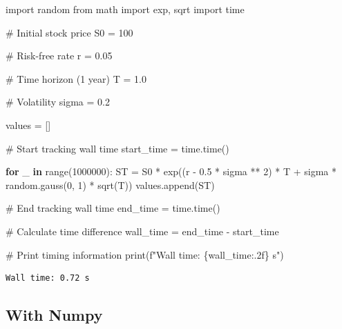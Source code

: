 \documentclass[
  letterpaper,
  DIV=11,
  numbers=noendperiod]{scrreprt}
\newenvironment{Shaded}{\begin{snugshade}}{\end{snugshade}}
\newcommand{\BuiltInTok}[1]{\textcolor[rgb]{0.00,0.23,0.31}{#1}}
\newcommand{\CommentTok}[1]{\textcolor[rgb]{0.37,0.37,0.37}{#1}}
\newcommand{\ControlFlowTok}[1]{\textcolor[rgb]{0.00,0.23,0.31}{\textbf{#1}}}
\newcommand{\DecValTok}[1]{\textcolor[rgb]{0.68,0.00,0.00}{#1}}
\newcommand{\FloatTok}[1]{\textcolor[rgb]{0.68,0.00,0.00}{#1}}
\newcommand{\ImportTok}[1]{\textcolor[rgb]{0.00,0.46,0.62}{#1}}
\newcommand{\KeywordTok}[1]{\textcolor[rgb]{0.00,0.23,0.31}{\textbf{#1}}}
\newcommand{\NormalTok}[1]{\textcolor[rgb]{0.00,0.23,0.31}{#1}}
\newcommand{\OperatorTok}[1]{\textcolor[rgb]{0.37,0.37,0.37}{#1}}
\newcommand{\SpecialCharTok}[1]{\textcolor[rgb]{0.37,0.37,0.37}{#1}}
\newcommand{\SpecialStringTok}[1]{\textcolor[rgb]{0.13,0.47,0.30}{#1}}
\begin{document}
\begin{Shaded}
\begin{Highlighting}[]
\ImportTok{import}\NormalTok{ random}
\ImportTok{from}\NormalTok{ math }\ImportTok{import}\NormalTok{ exp, sqrt}
\ImportTok{import}\NormalTok{ time }

\CommentTok{\# Initial stock price}
\NormalTok{S0 }\OperatorTok{=} \DecValTok{100} 

\CommentTok{\# Risk{-}free rate}
\NormalTok{r }\OperatorTok{=} \FloatTok{0.05} 

\CommentTok{\# Time horizon (1 year)}
\NormalTok{T }\OperatorTok{=} \FloatTok{1.0} 

\CommentTok{\# Volatility}
\NormalTok{sigma }\OperatorTok{=} \FloatTok{0.2} 

\NormalTok{values }\OperatorTok{=}\NormalTok{ []  }

\CommentTok{\# Start tracking wall time}
\NormalTok{start\_time }\OperatorTok{=}\NormalTok{ time.time()}

\ControlFlowTok{for}\NormalTok{ \_ }\KeywordTok{in} \BuiltInTok{range}\NormalTok{(}\DecValTok{1000000}\NormalTok{):  }
\NormalTok{     ST }\OperatorTok{=}\NormalTok{ S0 }\OperatorTok{*}\NormalTok{ exp((r }\OperatorTok{{-}} \FloatTok{0.5} \OperatorTok{*}\NormalTok{ sigma }\OperatorTok{**} \DecValTok{2}\NormalTok{) }\OperatorTok{*}\NormalTok{ T }\OperatorTok{+}
\NormalTok{        sigma }\OperatorTok{*}\NormalTok{ random.gauss(}\DecValTok{0}\NormalTok{, }\DecValTok{1}\NormalTok{) }\OperatorTok{*}\NormalTok{ sqrt(T))  }
\NormalTok{     values.append(ST)  }

\CommentTok{\# End tracking wall time}
\NormalTok{end\_time }\OperatorTok{=}\NormalTok{ time.time()}


\CommentTok{\# Calculate time difference}
\NormalTok{wall\_time }\OperatorTok{=}\NormalTok{ end\_time }\OperatorTok{{-}}\NormalTok{ start\_time}

\CommentTok{\# Print timing information}
\BuiltInTok{print}\NormalTok{(}\SpecialStringTok{f"Wall time: }\SpecialCharTok{\{}\NormalTok{wall\_time}\SpecialCharTok{:.2f\}}\SpecialStringTok{ s"}\NormalTok{)}
\end{Highlighting}
\end{Shaded}

\begin{verbatim}
Wall time: 0.72 s
\end{verbatim}

\subsection{With Numpy}\label{with-numpy}
\end{document}

